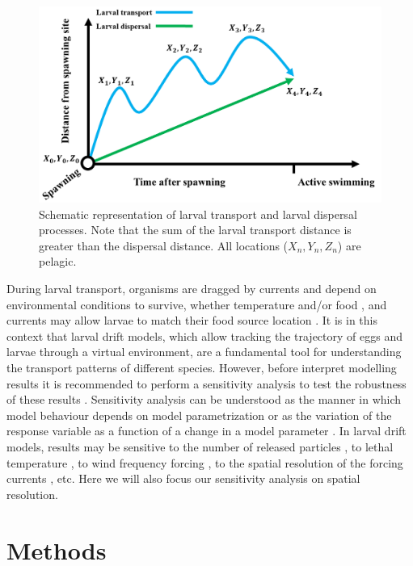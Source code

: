 \begin{figure}[ht]
	\includegraphics[width=1.0\textwidth]{figures/Chap2LarvalTransport.png}
	\centering
	\caption{Schematic representation of larval transport and larval dispersal processes. Note that the sum of the larval transport distance is greater than the dispersal distance. All locations ($X_{n},Y_{n},Z_{n}$) are pelagic.}
	\label{Chap2LarvalTransport}
\end{figure}

During larval transport, organisms are dragged by currents and depend on environmental conditions to survive, whether temperature and/or food \citep{NocrShaw1984}, and currents may allow larvae to match their food source location \citep{CuryRoy1989}. It is in this context that larval drift models, which allow tracking the trajectory of eggs and larvae through a virtual environment, are a fundamental tool for understanding the transport patterns of different species. However, before interpret modelling results it is recommended to perform a sensitivity analysis to test the robustness of these results \citep{PeckHufn2012,SimoSieg2013}. Sensitivity analysis can be understood as the manner in which model behaviour depends on model parametrization or as the variation of the response variable as a function of a change in a model parameter \citep{Hamb1994,Inga2008}. In larval drift models, results may be sensitive to the number of released particles \citep{SimoSieg2013}, to lethal temperature \citep{BrocLett2008}, to wind frequency forcing \citep{FlorTam2019}, to the spatial resolution of the forcing currents \citep{GaraKapl2014}, etc. Here we will also focus our sensitivity analysis on spatial resolution.\\

\clearpage

\section{Methods}\label{Chap2Meth}

